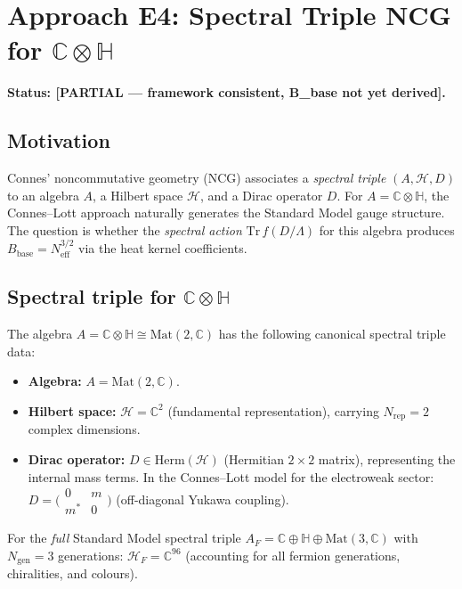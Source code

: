 \documentclass[11pt,a4paper]{article}
\theoremstyle{definition}
\theoremstyle{remark}
\begin{document}
\section{Approach E4: Spectral Triple NCG for $\mathbb{C}\otimes\mathbb{H}$}
\label{sec:E4_NCG}

\textbf{Status: [PARTIAL — framework consistent, B\_base not yet derived].}

\subsection{Motivation}

Connes' noncommutative geometry (NCG) associates a \emph{spectral triple}
$(A, \mathcal{H}, D)$ to an algebra $A$, a Hilbert space $\mathcal{H}$, and a
Dirac operator $D$.
For $A = \mathbb{C}\otimes\mathbb{H}$, the Connes--Lott approach naturally
generates the Standard Model gauge structure.
The question is whether the \emph{spectral action}
$\mathrm{Tr}\,f(D/\Lambda)$ for this algebra produces
$B_{\mathrm{base}} = N_{\mathrm{eff}}^{3/2}$ via the heat kernel coefficients.

\subsection{Spectral triple for $\mathbb{C}\otimes\mathbb{H}$}

The algebra $A = \mathbb{C}\otimes\mathbb{H} \cong \mathrm{Mat}(2,\mathbb{C})$
has the following canonical spectral triple data:
\begin{itemize}
  \item \textbf{Algebra:} $A = \mathrm{Mat}(2,\mathbb{C})$.
  \item \textbf{Hilbert space:} $\mathcal{H} = \mathbb{C}^2$ (fundamental representation),
    carrying $N_{\mathrm{rep}} = 2$ complex dimensions.
  \item \textbf{Dirac operator:} $D \in \mathrm{Herm}(\mathcal{H})$
    (Hermitian $2\times2$ matrix), representing the internal mass terms.
    In the Connes--Lott model for the electroweak sector:
    $D = \bigl(\begin{smallmatrix} 0 & m \\ m^* & 0 \end{smallmatrix}\bigr)$
    (off-diagonal Yukawa coupling).
\end{itemize}
For the \emph{full} Standard Model spectral triple
$A_F = \mathbb{C} \oplus \mathbb{H} \oplus \mathrm{Mat}(3,\mathbb{C})$
with $N_{\mathrm{gen}} = 3$ generations:
$\mathcal{H}_F = \mathbb{C}^{96}$ (accounting for all fermion generations, chiralities, and colours).
\end{document}
